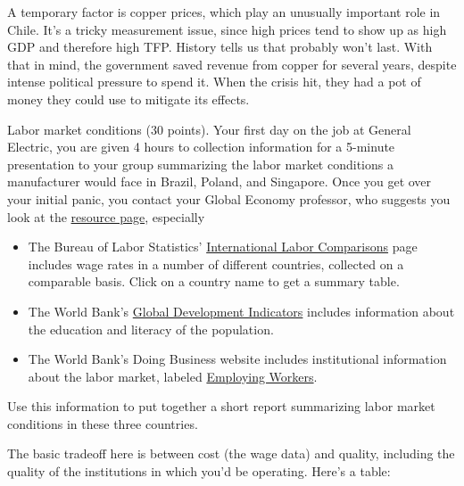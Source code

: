 \documentclass[12pt]{exam}
\begin{document}
\begin{questions}
\begin{solution}
\begin{parts}
A temporary factor is copper prices,
which play an unusually important role in Chile.
It's a tricky measurement issue, since
high prices  tend to show up as high GDP
and therefore high TFP.
History tells us that probably won't last.
With that in mind, the government saved revenue from copper
for several years,
despite intense political pressure to spend it.
When the crisis hit, they had a pot of money they could use to mitigate
its effects.
\end{parts}
\end{solution}

\question Labor market conditions (30 points).
Your first day on the job at General Electric,
you are given 4 hours to collection information for a 5-minute
presentation to your group summarizing the labor market
conditions a manufacturer would face in Brazil, Poland, and Singapore.
Once you get over your initial panic, you contact your Global Economy
professor, who suggests you look at the
\href{http://pages.stern.nyu.edu/~dbackus/macro_resources.htm}{resource page},
especially
%
\begin{itemize}
\item The Bureau of Labor Statistics'
\href{http://www.bls.gov/fls/}{International Labor Comparisons}
page includes wage rates in a number of different countries,
collected on a comparable basis.
Click on a country name to get a summary table.

\item The World Bank's
\href{http://data.worldbank.org/topic}{Global Development Indicators}
includes
information about the education and literacy of the population.

\item The World Bank's Doing Business website includes
institutional information about the labor market,
labeled
\href{http://www.doingbusiness.org/data/exploretopics/employing-workers}
{Employing Workers}.

\end{itemize}
%
Use this information to put together a short report
summarizing labor market conditions in these three countries.


\begin{solution}
The basic tradeoff here is between cost (the wage data)
and quality, including the quality of the institutions
in which you'd be operating.  Here's a table:


\end{solution}
\end{questions}
\end{document}
